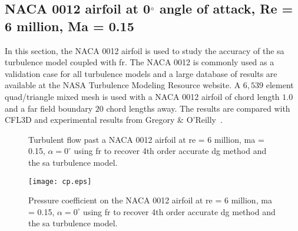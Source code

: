 \graphicspath{{\aiaadir /figures_RANS_naca0012/}}%

\subsection{NACA 0012 airfoil at 0$^{\circ}$ angle of attack, Re = 6 million, Ma = 0.15}
In this section, the NACA 0012 airfoil is used to study the accuracy of the \gls{sa} turbulence model coupled with \gls{fr}. The NACA 0012 is commonly used as a validation case for all turbulence models and a large database of results are available at the NASA Turbulence Modeling Resource website. A $6,539$ element quad/triangle mixed mesh is used with a NACA 0012 airfoil of chord length $1.0$ and a far field boundary $20$ chord lengths away. The results are compared with CFL3D and experimental results from Gregory \& O'Reilly~\cite{gregory1973low}.

\begin{figure}


  \caption{Turbulent flow past a NACA 0012 airfoil at \gls{re} = 6 million, \gls{ma} = 0.15, $\alpha = 0^{\circ}$ using \gls{fr} to recover 4th order accurate \gls{dg} method and the \gls{sa} turbulence model.}
  \label{RANS_naca0012}
\end{figure}

\begin{figure}
\centering
  \texttt{[image: cp.eps]}
  \caption{Pressure coefficient on the NACA 0012 airfoil at \gls{re} = 6 million, \gls{ma} = 0.15, $\alpha = 0^{\circ}$ using \gls{fr} to recover 4th order accurate \gls{dg} method and the \gls{sa} turbulence model.}
  \label{RANS_naca0012_cp}
\end{figure}


